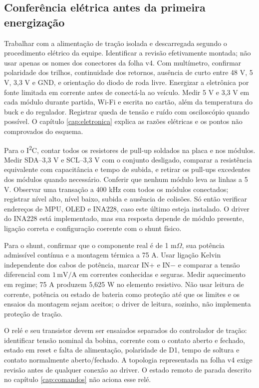 \subsection{Conferência elétrica antes da primeira energização}\label{sec:conferencia-eletrica}
Trabalhar com a alimentação de tração isolada e descarregada segundo o procedimento elétrico da equipe. Identificar a revisão efetivamente montada; não usar apenas os nomes dos conectores da folha v4. Com multímetro, confirmar polaridade dos trilhos, continuidade dos retornos, ausência de curto entre 48 V, 5 V, 3,3 V e GND, e orientação do diodo de roda livre. Energizar a eletrônica por fonte limitada em corrente antes de conectá-la ao veículo. Medir 5 V e 3,3 V em cada módulo durante partida, Wi-Fi e escrita no cartão, além da temperatura do buck e do regulador. Registrar queda de tensão e ruído com osciloscópio quando possível. O capítulo \ref{cap:eletronica} explica as razões elétricas e os pontos não comprovados do esquema.

Para o I\textsuperscript{2}C, contar todos os resistores de pull-up soldados na placa e nos módulos. Medir SDA--3,3 V e SCL--3,3 V com o conjunto desligado, comparar a resistência equivalente com capacitância e tempo de subida, e retirar os pull-ups excedentes dos módulos quando necessário. Conferir que nenhum módulo leva as linhas a 5 V. Observar uma transação a 400 kHz com todos os módulos conectados; registrar nível alto, nível baixo, subida e ausência de colisões. Só então verificar endereços de MPU, OLED e INA228, caso este último esteja instalado. O driver do INA228 está implementado, mas sua resposta depende de módulo presente, ligação correta e configuração coerente com o shunt físico.

Para o shunt, confirmar que o componente real é de 1 m$\Omega$, sua potência admissível contínua e a montagem térmica a 75 A. Usar ligação Kelvin independente dos cabos de potência, marcar IN+ e IN$-$ e comparar a tensão diferencial com $1\,\mathrm{mV/A}$ em correntes conhecidas e seguras. Medir aquecimento em regime; 75 A produzem 5,625 W no elemento resistivo. Não usar leitura de corrente, potência ou estado de bateria como proteção até que os limites e os ensaios da montagem sejam aceitos; o driver de leitura, sozinho, não implementa proteção de tração.

O relé e seu transistor devem ser ensaiados separados do controlador de tração: identificar tensão nominal da bobina, corrente com o contato aberto e fechado, estado em reset e falta de alimentação, polaridade de D1, tempo de soltura e contato normalmente aberto/fechado. A topologia representada na folha v4 exige revisão antes de qualquer conexão ao driver. O estado remoto de parada descrito no capítulo \ref{cap:comandos} não aciona esse relé.

